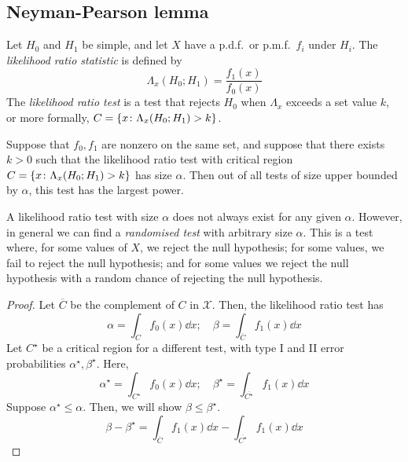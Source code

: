 \subsection{Neyman-Pearson lemma}
Let \( H_0 \) and \( H_1 \) be simple, and let \( X \) have a p.d.f.\ or p.m.f.\ \( f_i \) under \( H_i \).
The \textit{likelihood ratio statistic} is defined by
\[ \Lambda_x(H_0; H_1) = \frac{f_1(x)}{f_0(x)} \]
The \textit{likelihood ratio test} is a test that rejects \( H_0 \) when \( \Lambda_x \) exceeds a set value \( k \), or more formally, \( C = \qty{ x \colon \Lambda_x(H_0; H_1) > k } \).
\begin{lemma}
	Suppose that \( f_0, f_1 \) are nonzero on the same set, and suppose that there exists \( k > 0 \) such that the likelihood ratio test with critical region \( C = \qty{x \colon \Lambda_x(H_0; H_1) > k} \) has size \( \alpha \).
	Then out of all tests of size upper bounded by \( \alpha \), this test has the largest power.
\end{lemma}
\begin{remark}
	A likelihood ratio test with size \( \alpha \) does not always exist for any given \( \alpha \).
	However, in general we can find a \textit{randomised test} with arbitrary size \( \alpha \).
	This is a test where, for some values of \( X \), we reject the null hypothesis; for some values, we fail to reject the null hypothesis; and for some values we reject the null hypothesis with a random chance of rejecting the null hypothesis.
\end{remark}
\begin{proof}
	Let \( \overline C \) be the complement of \( C \) in \( \mathcal X \).
	Then, the likelihood ratio test has
	\[ \alpha = \int_C f_0(x) \dd{x};\quad \beta = \int_{\overline C} f_1(x) \dd{x} \]
	Let \( C^\star \) be a critical region for a different test, with type I and II error probabilities \( \alpha^\star, \beta^\star \).
	Here,
	\[ \alpha^\star = \int_{C^\star} f_0(x) \dd{x};\quad \beta^\star = \int_{\overline {C^\star}} f_1(x) \dd{x} \]
	Suppose \( \alpha^\star \leq \alpha \).
	Then, we will show \( \beta \leq \beta^\star \).
	\[ \beta - \beta^\star = \int_{\overline C} f_1(x) \dd{x} - \int_{\overline{C^\star}} f_1(x) \dd{x} \]
\end{proof}
